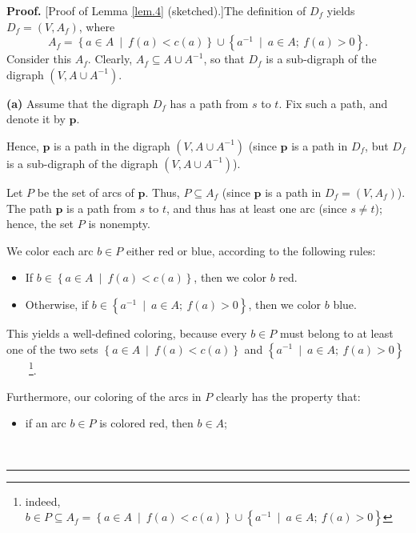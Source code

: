 \documentclass[numbers=enddot,12pt,final,onecolumn,notitlepage]{scrartcl}%
\theoremstyle{definition}
\newenvironment{proof}[1][Proof]{\noindent\textbf{#1.} }{\ \rule{0.5em}{0.5em}}
\begin{document}
\begin{proof}
[Proof of Lemma \ref{lem.4} (sketched).]The definition of $D_{f}$ yields
$D_{f}=\left(  V,A_{f}\right)  $, where%
\[
A_{f}=\left\{  a\in A\ \mid\ f\left(  a\right)  <c\left(  a\right)  \right\}
\cup\left\{  a^{-1}\ \mid\ a\in A;\ f\left(  a\right)  >0\right\}  .
\]
Consider this $A_{f}$. Clearly, $A_{f}\subseteq A\cup A^{-1}$, so that $D_{f}$
is a sub-digraph of the digraph $\left(  V,A\cup A^{-1}\right)  $.

\textbf{(a)} Assume that the digraph $D_{f}$ has a path from $s$ to $t$. Fix
such a path, and denote it by $\mathbf{p}$.

Hence, $\mathbf{p}$ is a path in the digraph $\left(  V,A\cup A^{-1}\right)  $
(since $\mathbf{p}$ is a path in $D_{f}$, but $D_{f}$ is a sub-digraph of the
digraph $\left(  V,A\cup A^{-1}\right)  $).

Let $P$ be the set of arcs of $\mathbf{p}$. Thus, $P\subseteq A_{f}$ (since
$\mathbf{p}$ is a path in $D_{f}=\left(  V,A_{f}\right)  $). The path
$\mathbf{p}$ is a path from $s$ to $t$, and thus has at least one arc (since
$s\neq t$); hence, the set $P$ is nonempty.

We color each arc $b\in P$ either red or blue, according to the following rules:

\begin{itemize}
\item If $b\in\left\{  a\in A\ \mid\ f\left(  a\right)  <c\left(  a\right)
\right\}  $, then we color $b$ red.

\item Otherwise, if $b\in\left\{  a^{-1}\ \mid\ a\in A;\ f\left(  a\right)
>0\right\}  $, then we color $b$ blue.
\end{itemize}

This yields a well-defined coloring, because every $b\in P$ must belong to at
least one of the two sets $\left\{  a\in A\ \mid\ f\left(  a\right)  <c\left(
a\right)  \right\}  $ and $\left\{  a^{-1}\ \mid\ a\in A;\ f\left(  a\right)
>0\right\}  $\ \ \ \ \footnote{indeed, $b\in P\subseteq A_{f}=\left\{  a\in
A\ \mid\ f\left(  a\right)  <c\left(  a\right)  \right\}  \cup\left\{
a^{-1}\ \mid\ a\in A;\ f\left(  a\right)  >0\right\}  $}.

Furthermore, our coloring of the arcs in $P$ clearly has the property that:

\begin{itemize}
\item if an arc $b\in P$ is colored red, then $b\in A$;


\end{itemize}
\end{proof}
\end{document}
